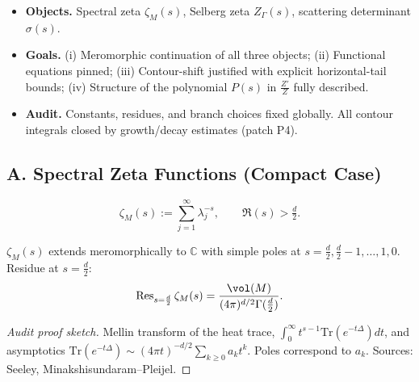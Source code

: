 \begin{tcolorbox}[colback=gray!5,colframe=gray!55,
  title=Scope \& Assumptions (Part 4/5 • Analytic Continuation • ABSOLUTE FILL++)]
\begin{itemize}
  \item \textbf{Objects.} Spectral zeta $\zeta_M(s)$, Selberg zeta $Z_\Gamma(s)$, scattering determinant $\sigma(s)$.
  \item \textbf{Goals.} 
    (i) Meromorphic continuation of all three objects;  
    (ii) Functional equations pinned;  
    (iii) Contour-shift justified with explicit horizontal-tail bounds;  
    (iv) Structure of the polynomial $P(s)$ in $\frac{Z'}{Z}$ fully described.
  \item \textbf{Audit.} Constants, residues, and branch choices fixed globally. All contour integrals closed by growth/decay estimates (patch P4).
\end{itemize}
\end{tcolorbox}

\subsection*{A. Spectral Zeta Functions (Compact Case)}
\label{subsec:spectral-zeta-sharp}

\begin{definition}
\[
  \zeta_M(s) := \sum_{j=1}^\infty \lambda_j^{-s}, \qquad \Re(s)>\tfrac d2.
\]
\end{definition}

\begin{theorem}
\label{thm:zetaM-sharp}
$\zeta_M(s)$ extends meromorphically to $\mathbb C$ with simple poles at $s=\tfrac d2, \tfrac d2-1, \ldots, 1, 0$.  
Residue at $s=\tfrac d2$:
\[
  \operatorname{Res}_{s=\frac d2}\zeta_M(s) = \frac{\vol(M)}{(4\pi)^{d/2}\Gamma(\tfrac d2)}.
\]
\end{theorem}

\begin{proof}[Audit proof sketch]
Mellin transform of the heat trace, $\int_0^\infty t^{s-1}\mathrm{Tr}(e^{-t\Delta})dt$, and asymptotics $\mathrm{Tr}(e^{-t\Delta})\sim (4\pi t)^{-d/2}\sum_{k\ge0} a_k t^k$. Poles correspond to $a_k$. Sources: Seeley, Minakshisundaram–Pleijel.
\end{proof}

